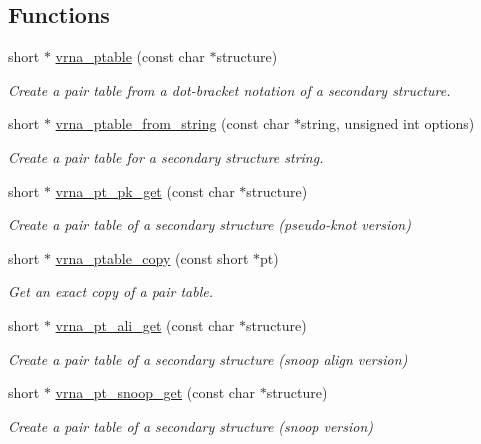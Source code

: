 \subsection*{Functions}
\begin{DoxyCompactItemize}
\item 
short $\ast$ \hyperlink{group__struct__utils__pair__table_gae829fb8bb7f694c12a9c0bbc34c77c60}{vrna\+\_\+ptable} (const char $\ast$structure)
\begin{DoxyCompactList}\small\item\em Create a pair table from a dot-\/bracket notation of a secondary structure. \end{DoxyCompactList}\item 
short $\ast$ \hyperlink{group__struct__utils__pair__table_gac76c9ef3de507748fb0416a59323362b}{vrna\+\_\+ptable\+\_\+from\+\_\+string} (const char $\ast$string, unsigned int options)
\begin{DoxyCompactList}\small\item\em Create a pair table for a secondary structure string. \end{DoxyCompactList}\item 
short $\ast$ \hyperlink{group__struct__utils__pair__table_gacca520048b24ec5a8978f4dafb4e4bf8}{vrna\+\_\+pt\+\_\+pk\+\_\+get} (const char $\ast$structure)
\begin{DoxyCompactList}\small\item\em Create a pair table of a secondary structure (pseudo-\/knot version) \end{DoxyCompactList}\item 
short $\ast$ \hyperlink{group__struct__utils__pair__table_ga2daefbbd6d9f8803731651882f54332d}{vrna\+\_\+ptable\+\_\+copy} (const short $\ast$pt)
\begin{DoxyCompactList}\small\item\em Get an exact copy of a pair table. \end{DoxyCompactList}\item 
\mbox{\label{group__struct__utils__pair__table_ga1ee4cdcda1f57d32dcb38032116d335d}} 
short $\ast$ \hyperlink{group__struct__utils__pair__table_ga1ee4cdcda1f57d32dcb38032116d335d}{vrna\+\_\+pt\+\_\+ali\+\_\+get} (const char $\ast$structure)
\begin{DoxyCompactList}\small\item\em Create a pair table of a secondary structure (snoop align version) \end{DoxyCompactList}\item 
short $\ast$ \hyperlink{group__struct__utils__pair__table_gaef0f7e1a6c00c81a349973de53039dda}{vrna\+\_\+pt\+\_\+snoop\+\_\+get} (const char $\ast$structure)
\begin{DoxyCompactList}\small\item\em Create a pair table of a secondary structure (snoop version) \end{DoxyCompactList}\end{DoxyCompactItemize}


